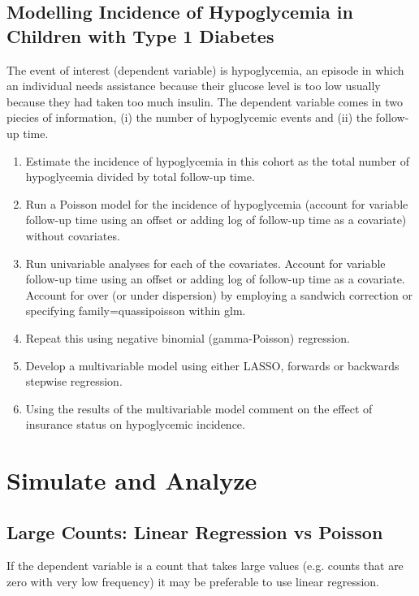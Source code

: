 \documentclass[12pt]{article}
\newenvironment{enum1}
{\begin{enumerate}
  \setlength{\itemsep}{1pt}
  \setlength{\parskip}{0pt}
  \setlength{\parsep}{0pt}
}{\end{enumerate}}
\begin{document}
\subsection{Modelling Incidence of Hypoglycemia in Children with Type 1 Diabetes}

The event of interest (dependent variable) is hypoglycemia, an episode in which an individual needs assistance because their glucose level is too low usually because they had taken too much insulin. The dependent variable comes in two piecies of information, (i) the number of hypoglycemic events and (ii) the follow-up time.
\begin{enum1}
\item Estimate the incidence of hypoglycemia in this cohort as the total number of hypoglycemia divided by total follow-up time.
\item Run a Poisson model for the incidence of hypoglycemia (account for variable follow-up time using an offset or adding log of follow-up time as a covariate) without  covariates.
\item Run univariable analyses for each of the covariates.  Account for variable follow-up time using an offset or adding log of follow-up time as a covariate. Account for over (or under dispersion) by employing a sandwich correction or specifying family=quassipoisson within glm.
\item Repeat this using negative binomial (gamma-Poisson) regression.
\item Develop a multivariable model using either LASSO, forwards or backwards stepwise regression.
\item Using the results of the multivariable model comment on the effect of insurance status on hypoglycemic incidence.
\end{enum1}


\section{Simulate and Analyze}

\subsection{Large Counts: Linear Regression vs Poisson}

If the dependent variable is a count that takes large values (e.g. counts that are zero with very low frequency) it may be preferable to use linear regression.
\end{document}
